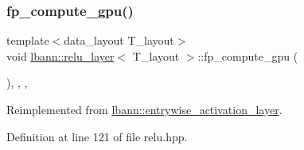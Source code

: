 \subsubsection{\texorpdfstring{fp\+\_\+compute\+\_\+gpu()}{fp\_compute\_gpu()}}
{\footnotesize\ttfamily template$<$data\+\_\+layout T\+\_\+layout$>$ \\
void \hyperlink{classlbann_1_1relu__layer}{lbann\+::relu\+\_\+layer}$<$ T\+\_\+layout $>$\+::fp\+\_\+compute\+\_\+gpu (\begin{DoxyParamCaption}{ }\end{DoxyParamCaption})\hspace{0.3cm}{\ttfamily [inline]}, {\ttfamily [override]}, {\ttfamily [protected]}, {\ttfamily [virtual]}}



Reimplemented from \hyperlink{classlbann_1_1entrywise__activation__layer_aeb270dda0c2ec95dd34c35e1e8300f11}{lbann\+::entrywise\+\_\+activation\+\_\+layer}.



Definition at line 121 of file relu.\+hpp.


